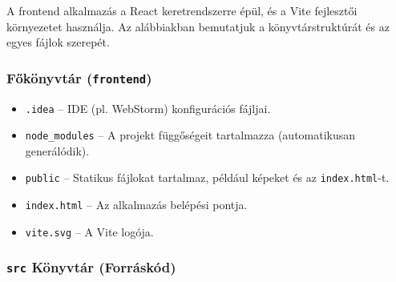 \documentclass{report}[11pt]
\begin{document}
A frontend alkalmazás a React keretrendszerre épül, és a Vite fejlesztői környezetet használja. Az alábbiakban bemutatjuk a könyvtárstruktúrát és az egyes fájlok szerepét.

\subsubsection{Főkönyvtár (\texttt{frontend})}

\begin{itemize}
    \item \texttt{.idea} – IDE (pl. WebStorm) konfigurációs fájljai.
    \item \texttt{node\_modules} – A projekt függőségeit tartalmazza (automatikusan generálódik).
    \item \texttt{public} – Statikus fájlokat tartalmaz, például képeket és az \texttt{index.html}-t.
    \item \texttt{index.html} – Az alkalmazás belépési pontja.
    \item \texttt{vite.svg} – A Vite logója.
\end{itemize}

\subsubsection{\texttt{src} Könyvtár (Forráskód)}
\end{document}
